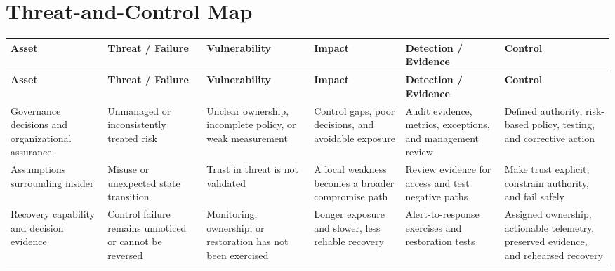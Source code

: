 \documentclass[11pt,letterpaper]{article}
\begin{document}
\section*{Threat-and-Control Map}
\begingroup\scriptsize\setlength{\tabcolsep}{2pt}
\begin{longtable}{>{\raggedright\arraybackslash}p{}>{\raggedright\arraybackslash}p{}>{\raggedright\arraybackslash}p{}>{\raggedright\arraybackslash}p{}>{\raggedright\arraybackslash}p{}>{\raggedright\arraybackslash}p{}}
\toprule\rowcolor{Navy}\color{white}\textbf{Asset} & \color{white}\textbf{Threat / Failure} & \color{white}\textbf{Vulnerability} & \color{white}\textbf{Impact} & \color{white}\textbf{Detection / Evidence} & \color{white}\textbf{Control}\\\midrule
\endfirsthead
\toprule\rowcolor{Navy}\color{white}\textbf{Asset} & \color{white}\textbf{Threat / Failure} & \color{white}\textbf{Vulnerability} & \color{white}\textbf{Impact} & \color{white}\textbf{Detection / Evidence} & \color{white}\textbf{Control}\\\midrule
\endhead
Governance decisions and organizational assurance & Unmanaged or inconsistently treated risk & Unclear ownership, incomplete policy, or weak measurement & Control gaps, poor decisions, and avoidable exposure & Audit evidence, metrics, exceptions, and management review & Defined authority, risk-based policy, testing, and corrective action\\\midrule
Assumptions surrounding insider & Misuse or unexpected state transition & Trust in threat is not validated & A local weakness becomes a broader compromise path & Review evidence for access and test negative paths & Make trust explicit, constrain authority, and fail safely\\\midrule
Recovery capability and decision evidence & Control failure remains unnoticed or cannot be reversed & Monitoring, ownership, or restoration has not been exercised & Longer exposure and slower, less reliable recovery & Alert-to-response exercises and restoration tests & Assigned ownership, actionable telemetry, preserved evidence, and rehearsed recovery\\\midrule
\bottomrule
\end{longtable}
\endgroup
\end{document}
